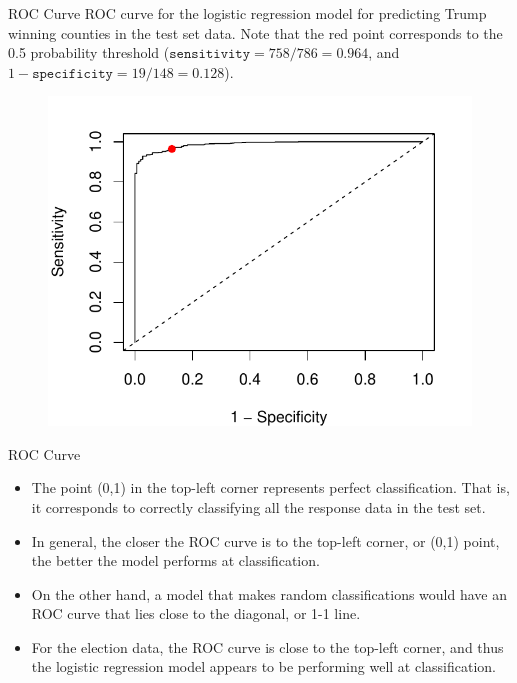 \documentclass[10pt]{beamer}\usepackage[]{graphicx}\usepackage[]{color}
\begin{document}
\begin{frame}{ROC Curve}
ROC curve for the logistic regression model for predicting Trump winning counties in the test set data.  Note that the red point corresponds to the 0.5 probability threshold  ($\texttt{sensitivity} = 758/786 = 0.964$, and $1 - \texttt{specificity} = 19/148 = 0.128$).
\begin{figure}
\includegraphics[scale=0.6]{ROC1.pdf}
\end{figure}
\end{frame}

\begin{frame}{ROC Curve}
\begin{itemize}
\item The point (0,1) in the top-left corner represents perfect classification.  That is, it corresponds to correctly classifying all the response data in the test set.
\vspace{5pt}

\item In general, the closer the ROC curve is to the top-left corner, or (0,1) point, the better the model performs at classification. 
\vspace{5pt}
\item On the other hand, a model that makes random classifications would have an ROC curve that lies close to the diagonal, or 1-1 line. 
\vspace{5pt}
\item For the election data, the ROC curve is close to the top-left corner, and thus the logistic regression model appears to be performing well at classification. 
\end{itemize}
\end{frame}
\end{document}
